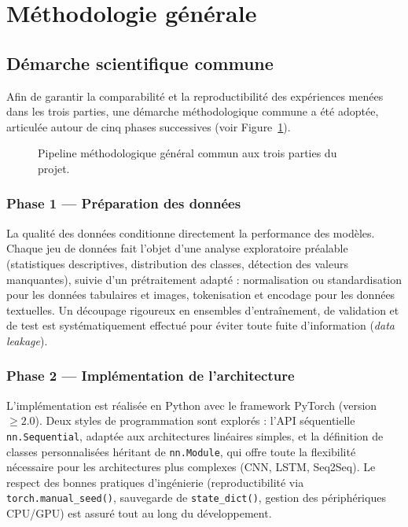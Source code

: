 \documentclass[11pt,a4paper]{article}
\begin{document}
\section{Méthodologie générale}

\subsection{Démarche scientifique commune}

Afin de garantir la comparabilité et la reproductibilité des expériences menées dans
les trois parties, une démarche méthodologique commune a été adoptée, articulée autour
de cinq phases successives (voir Figure~\ref{fig:pipeline_methodologie}).

\begin{figure}[H]
  \centering
  \caption{Pipeline méthodologique général commun aux trois parties du projet.}
  \label{fig:pipeline_methodologie}
\end{figure}

\subsubsection{Phase 1 — Préparation des données}

La qualité des données conditionne directement la performance des modèles. Chaque jeu
de données fait l'objet d'une analyse exploratoire préalable (statistiques descriptives,
distribution des classes, détection des valeurs manquantes), suivie d'un prétraitement
adapté : normalisation ou standardisation pour les données tabulaires et images,
tokenisation et encodage pour les données textuelles. Un découpage rigoureux en
ensembles d'entraînement, de validation et de test est systématiquement effectué pour
éviter toute fuite d'information (\textit{data leakage}).

\subsubsection{Phase 2 — Implémentation de l'architecture}

L'implémentation est réalisée en Python avec le framework PyTorch (version $\geq 2.0$).
Deux styles de programmation sont explorés : l'API séquentielle \texttt{nn.Sequential},
adaptée aux architectures linéaires simples, et la définition de classes personnalisées
héritant de \texttt{nn.Module}, qui offre toute la flexibilité nécessaire pour les
architectures plus complexes (CNN, LSTM, Seq2Seq). Le respect des bonnes pratiques
d'ingénierie (reproductibilité via \texttt{torch.manual\_seed()}, sauvegarde de
\texttt{state\_dict()}, gestion des périphériques CPU/GPU) est assuré tout au long
du développement.
\end{document}
